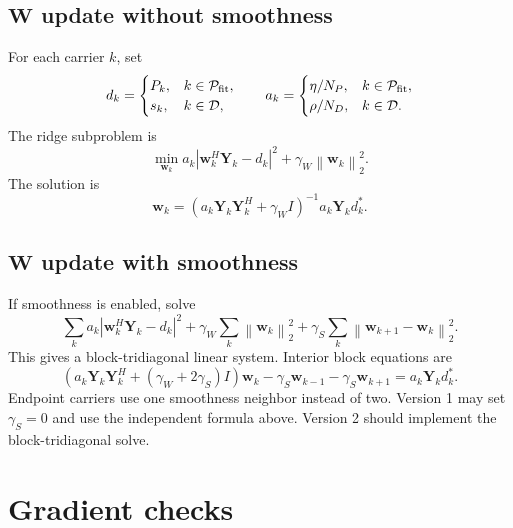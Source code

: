 \documentclass[11pt]{article}
\newcommand{\norm}[1]{\left\lVert #1 \right\rVert}
\newcommand{\abs}[1]{\left\lvert #1 \right\rvert}
\begin{document}
\subsection{$\mathbf W$ update without smoothness}

For each carrier $k$, set
\begin{equation}
d_k=\begin{cases}
P_k, & k\in\mathcal P_{\rm fit},\\
s_k, & k\in\mathcal D,
\end{cases}
\qquad
a_k=\begin{cases}
\eta/N_P, & k\in\mathcal P_{\rm fit},\\
\rho/N_D, & k\in\mathcal D.
\end{cases}
\end{equation}
The ridge subproblem is
\begin{equation}
\min_{\mathbf w_k}
a_k\abs{\mathbf w_k^H\mathbf Y_k-d_k}^2+\gamma_W\norm{\mathbf w_k}_2^2.
\end{equation}
The solution is
\begin{equation}
\boxed{
\mathbf w_k=
\left(a_k\mathbf Y_k\mathbf Y_k^H+\gamma_W I\right)^{-1}
a_k\mathbf Y_k d_k^*.}
\end{equation}

\subsection{$\mathbf W$ update with smoothness}

If smoothness is enabled, solve
\begin{equation}
\sum_k a_k\abs{\mathbf w_k^H\mathbf Y_k-d_k}^2
+\gamma_W\sum_k\norm{\mathbf w_k}_2^2
+\gamma_S\sum_k\norm{\mathbf w_{k+1}-\mathbf w_k}_2^2.
\end{equation}
This gives a block-tridiagonal linear system.  Interior block equations are
\begin{equation}
\left(a_k\mathbf Y_k\mathbf Y_k^H+(\gamma_W+2\gamma_S)I\right)\mathbf w_k
-\gamma_S\mathbf w_{k-1}
-\gamma_S\mathbf w_{k+1}
=a_k\mathbf Y_k d_k^*.
\end{equation}
Endpoint carriers use one smoothness neighbor instead of two.  Version 1 may set $\gamma_S=0$ and use the independent formula above.  Version 2 should implement the block-tridiagonal solve.

\section{Gradient checks}
\label{sec:checks}
\end{document}
